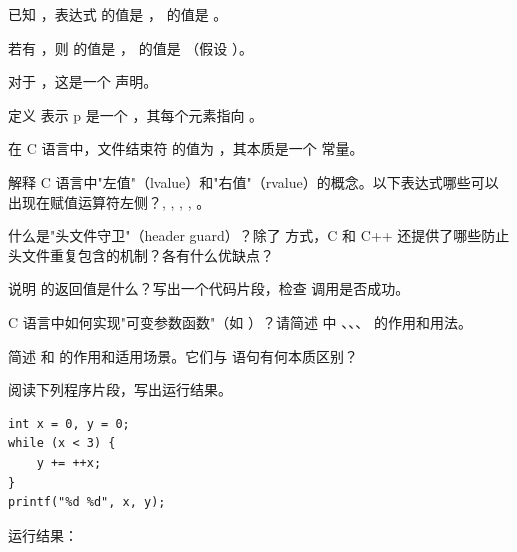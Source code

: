 \documentclass[a4paper,11pt]{article}
\begin{document}
\examtitle


\anslines{0.1cm}

\q 已知 ，表达式  的值是 \fillblank ， 的值是 \fillblank 。

\q 若有 ，则  的值是 \fillblank ， 的值是 \fillblank（假设 ）。

\q 对于 ，这是一个 \fillblank 声明。

\q 定义  表示 p 是一个 \fillblank ，其每个元素指向 \fillblank 。

\q 在 C 语言中，文件结束符  的值为 \fillblank ，其本质是一个 \fillblank 常量。


\q 解释 C 语言中"左值"（lvalue）和"右值"（rvalue）的概念。以下表达式哪些可以出现在赋值运算符左侧？, , , , 。
\anslines{1.5cm}

\q 什么是"头文件守卫"（header guard）？除了  方式，C 和 C++ 还提供了哪些防止头文件重复包含的机制？各有什么优缺点？
\anslines{1.5cm}

\q 说明  的返回值是什么？写出一个代码片段，检查  调用是否成功。
\anslines{1.5cm}

\q C 语言中如何实现"可变参数函数"（如 ）？请简述  中 、、、 的作用和用法。
\anslines{1.5cm}

\q 简述  和  的作用和适用场景。它们与  语句有何本质区别？
\anslines{1.5cm}


阅读下列程序片段，写出运行结果。

\q
\begin{lstlisting}[language={[custom]C}]
int x = 0, y = 0;
while (x < 3) {
    y += ++x;
}
printf("%d %d", x, y);
\end{lstlisting}
运行结果：\underline{\hspace{3cm}}
\end{document}
